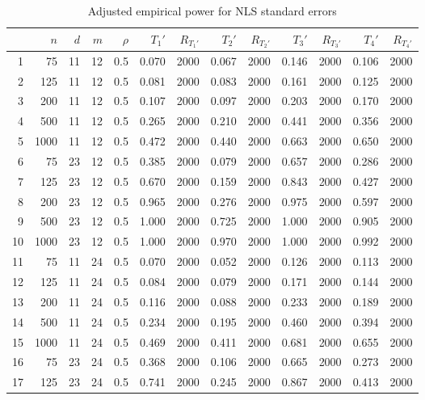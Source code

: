\documentclass{article}
\begin{document}
\begin{table}[ht]
\begin{center}
\caption{Adjusted empirical power for NLS standard errors}
\label{tab:adjpowernls}
\begin{tabular}{rrrrrrrrrrrrr}
  \hline
 & $n$ & $d$ & $m$ & $\rho$ & $T_1'$ & $R_{T_1'}$ & $T_2'$ & $R_{T_2'}$ & $T_3'$ & $R_{T_3'}$ & $T_4'$ & $R_{T_4'}$ \\ 
  \hline
1 & 75 & 11 & 12 & 0.5 & 0.070 & 2000 & 0.067 & 2000 & 0.146 & 2000 & 0.106 & 2000 \\ 
  2 & 125 & 11 & 12 & 0.5 & 0.081 & 2000 & 0.083 & 2000 & 0.161 & 2000 & 0.125 & 2000 \\ 
  3 & 200 & 11 & 12 & 0.5 & 0.107 & 2000 & 0.097 & 2000 & 0.203 & 2000 & 0.170 & 2000 \\ 
  4 & 500 & 11 & 12 & 0.5 & 0.265 & 2000 & 0.210 & 2000 & 0.441 & 2000 & 0.356 & 2000 \\ 
  5 & 1000 & 11 & 12 & 0.5 & 0.472 & 2000 & 0.440 & 2000 & 0.663 & 2000 & 0.650 & 2000 \\ 
   \hline
6 & 75 & 23 & 12 & 0.5 & 0.385 & 2000 & 0.079 & 2000 & 0.657 & 2000 & 0.286 & 2000 \\ 
  7 & 125 & 23 & 12 & 0.5 & 0.670 & 2000 & 0.159 & 2000 & 0.843 & 2000 & 0.427 & 2000 \\ 
  8 & 200 & 23 & 12 & 0.5 & 0.965 & 2000 & 0.276 & 2000 & 0.975 & 2000 & 0.597 & 2000 \\ 
  9 & 500 & 23 & 12 & 0.5 & 1.000 & 2000 & 0.725 & 2000 & 1.000 & 2000 & 0.905 & 2000 \\ 
  10 & 1000 & 23 & 12 & 0.5 & 1.000 & 2000 & 0.970 & 2000 & 1.000 & 2000 & 0.992 & 2000 \\ 
   \hline
11 & 75 & 11 & 24 & 0.5 & 0.070 & 2000 & 0.052 & 2000 & 0.126 & 2000 & 0.113 & 2000 \\ 
  12 & 125 & 11 & 24 & 0.5 & 0.084 & 2000 & 0.079 & 2000 & 0.171 & 2000 & 0.144 & 2000 \\ 
  13 & 200 & 11 & 24 & 0.5 & 0.116 & 2000 & 0.088 & 2000 & 0.233 & 2000 & 0.189 & 2000 \\ 
  14 & 500 & 11 & 24 & 0.5 & 0.234 & 2000 & 0.195 & 2000 & 0.460 & 2000 & 0.394 & 2000 \\ 
  15 & 1000 & 11 & 24 & 0.5 & 0.469 & 2000 & 0.411 & 2000 & 0.681 & 2000 & 0.655 & 2000 \\ 
   \hline
16 & 75 & 23 & 24 & 0.5 & 0.368 & 2000 & 0.106 & 2000 & 0.665 & 2000 & 0.273 & 2000 \\ 
  17 & 125 & 23 & 24 & 0.5 & 0.741 & 2000 & 0.245 & 2000 & 0.867 & 2000 & 0.413 & 2000 \\ 

\end{tabular}
\end{center}
\end{table}
\end{document}
